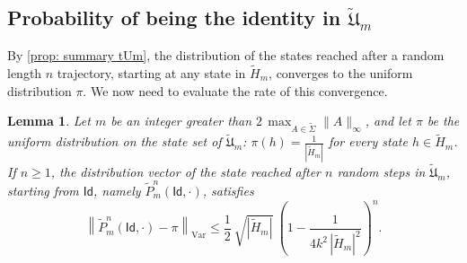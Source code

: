 \documentclass{article}
\def\alph{\tilde{\Sigma}}
\def\Id{\textsf{Id}}
\def\tU{\tilde{\mathfrak{U}}}
\def\tH{\tilde{H}}
\def\tP{\tilde{P}}
\theoremstyle{plain}
\newtheorem{lemma}[theorem]{Lemma}
\theoremstyle{definition}
\begin{document}
\subsection{Probability of being the identity in $\tU_m$}

By \cref{prop: summary tUm}, the distribution of the states reached after a random length $n$ trajectory, starting at any state in $\tH_m$, converges to the uniform distribution $\pi$.
%
We now need to evaluate the rate of this convergence.

\begin{lemma}\label{lm:convergence rate}
Let $m$ be an integer greater than $2\,\max_{A\in \alph}\|A\|_\infty$, and let $\pi$ be the uniform distribution on the state set of $\tU_m$: $\pi(h) = \frac1{|\tH_m|}$ for every state $h\in \tH_m$. If $n \ge 1$, the distribution vector of the state reached after $n$ random steps in $\tU_m$, starting from $\Id$, namely $\tP_m^n(\Id,\cdot)$, satisfies
\begin{equation}\label{eq:total variation}
\left\| \tP_m^n(\Id,\cdot) - \pi \right\|_{\text{Var}}
\leq \frac12\ \sqrt{|\tH_m|}\ \left(1-\frac1{4k^2\,|\tH_m|^2}\right)^{n}.
\end{equation}
\end{lemma}
\end{document}
